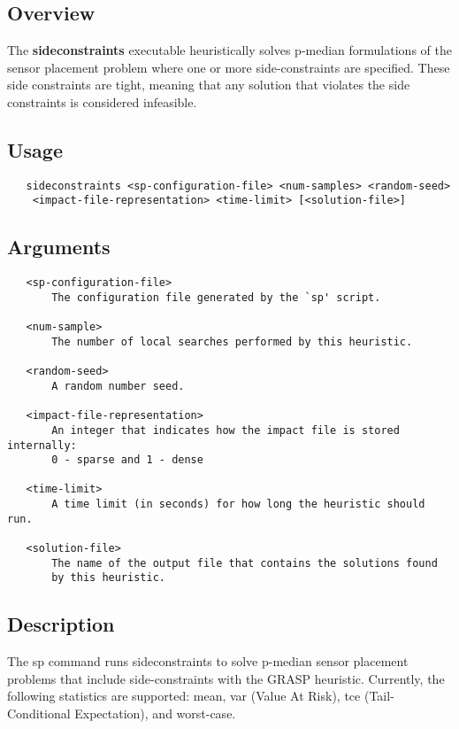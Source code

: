 \subsection{Overview}\label{sideconstraintsExecutable_sideconstraintsOverview}

The {\bfseries sideconstraints} executable heuristically solves p-\/median formulations of the sensor placement problem where one or more side-\/constraints are specified. These side constraints are tight, meaning that any solution that violates the side constraints is considered infeasible.

\subsection{Usage}\label{sideconstraintsExecutable_sideconstraintsUsage}

\begin{verbatim}
   sideconstraints <sp-configuration-file> <num-samples> <random-seed> 
	<impact-file-representation> <time-limit> [<solution-file>]
\end{verbatim}

\subsection{Arguments}\label{sideconstraintsExecutable_sideconstraintsArgs}

\begin{verbatim} 
   <sp-configuration-file>
	   The configuration file generated by the `sp' script.

   <num-sample>
	   The number of local searches performed by this heuristic.

   <random-seed>
	   A random number seed.

   <impact-file-representation>
	   An integer that indicates how the impact file is stored internally:
	   0 - sparse and 1 - dense

   <time-limit>
	   A time limit (in seconds) for how long the heuristic should run.

   <solution-file>
	   The name of the output file that contains the solutions found
	   by this heuristic.
\end{verbatim}

\subsection{Description}\label{sideconstraintsExecutable_sideconstraintsDescription}

The {\ttfamily sp} command runs {\ttfamily sideconstraints} to solve p-\/median sensor placement problems that include side-\/constraints with the GRASP heuristic. Currently, the following statistics are supported: mean, var (Value At Risk), tce (Tail-\/Conditional Expectation), and worst-\/case.

